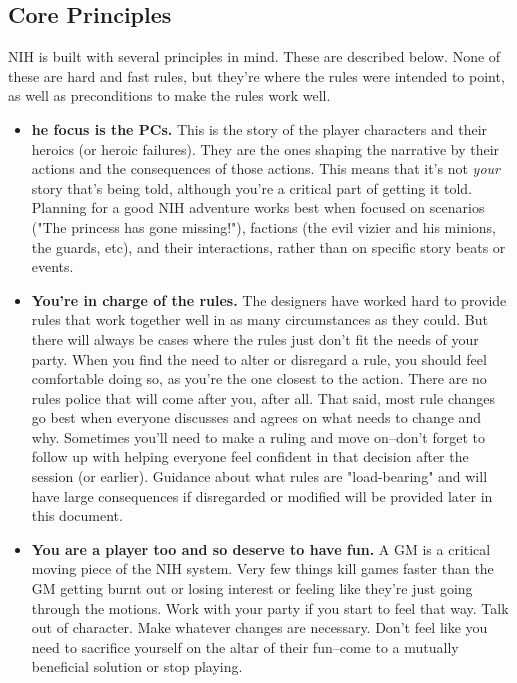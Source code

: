 \documentclass[10pt,twoside,openany,bg=none]{dndbook}
\begin{document}
\subsection{Core Principles}
NIH is built with several principles in mind. These are described below. None of these are hard and fast rules, but they're where the rules were intended to point, as well as preconditions to make the rules work well.
\begin{itemize}
    \item[] \textbf{he focus is the PCs.} This is the story of the player characters and their heroics (or heroic failures). They are the ones shaping the narrative by their actions and the consequences of those actions. This means that it's not \textit{your} story that's being told, although you're a critical part of getting it told. Planning for a good NIH adventure works best when focused on scenarios ("The princess has gone missing!"), factions (the evil vizier and his minions, the guards, etc), and their interactions, rather than on specific story beats or events. 
    \item[] \textbf{You're in charge of the rules.} The designers have worked hard to provide rules that work together well in as many circumstances as they could. But there will always be cases where the rules just don't fit the needs of your party. When you find the need to alter or disregard a rule, you should feel comfortable doing so, as you're the one closest to the action. There are no rules police that will come after you, after all. That said, most rule changes go best when everyone discusses and agrees on what needs to change and why. Sometimes you'll need to make a ruling and move on--don't forget to follow up with helping everyone feel confident in that decision after the session (or earlier). Guidance about what rules are "load-bearing" and will have large consequences if disregarded or modified will be provided later in this document.
    \item[] \textbf{You are a player too and so deserve to have fun.} A GM is a critical moving piece of the NIH system. Very few things kill games faster than the GM getting burnt out or losing interest or feeling like they're just going through the motions. Work with your party if you start to feel that way. Talk out of character. Make whatever changes are necessary. Don't feel like you need to sacrifice yourself on the altar of their fun--come to a mutually beneficial solution or stop playing.

\end{itemize}
\end{document}
